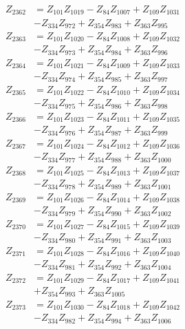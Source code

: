 \begin{multicols}{2}
\begin{align}
Z_{2362} &= Z_{101}Z_{1019} - Z_{84}Z_{1007} + Z_{109}Z_{1031}  \nonumber \\
&- Z_{334}Z_{972} + Z_{354}Z_{983} + Z_{363}Z_{995} \nonumber \\
Z_{2363} &= Z_{101}Z_{1020} - Z_{84}Z_{1008} + Z_{109}Z_{1032}  \nonumber \\
&- Z_{334}Z_{973} + Z_{354}Z_{984} + Z_{363}Z_{996} \nonumber \\
Z_{2364} &= Z_{101}Z_{1021} - Z_{84}Z_{1009} + Z_{109}Z_{1033}  \nonumber \\
&- Z_{334}Z_{974} + Z_{354}Z_{985} + Z_{363}Z_{997} \nonumber \\
Z_{2365} &= Z_{101}Z_{1022} - Z_{84}Z_{1010} + Z_{109}Z_{1034}  \nonumber \\
&- Z_{334}Z_{975} + Z_{354}Z_{986} + Z_{363}Z_{998} \nonumber \\
Z_{2366} &= Z_{101}Z_{1023} - Z_{84}Z_{1011} + Z_{109}Z_{1035}  \nonumber \\
&- Z_{334}Z_{976} + Z_{354}Z_{987} + Z_{363}Z_{999} \nonumber \\
Z_{2367} &= Z_{101}Z_{1024} - Z_{84}Z_{1012} + Z_{109}Z_{1036}  \nonumber \\
&- Z_{334}Z_{977} + Z_{354}Z_{988} + Z_{363}Z_{1000} \nonumber \\
Z_{2368} &= Z_{101}Z_{1025} - Z_{84}Z_{1013} + Z_{109}Z_{1037}  \nonumber \\
&- Z_{334}Z_{978} + Z_{354}Z_{989} + Z_{363}Z_{1001} \nonumber \\
Z_{2369} &= Z_{101}Z_{1026} - Z_{84}Z_{1014} + Z_{109}Z_{1038}  \nonumber \\
&- Z_{334}Z_{979} + Z_{354}Z_{990} + Z_{363}Z_{1002} \nonumber \\
Z_{2370} &= Z_{101}Z_{1027} - Z_{84}Z_{1015} + Z_{109}Z_{1039}  \nonumber \\
&- Z_{334}Z_{980} + Z_{354}Z_{991} + Z_{363}Z_{1003} \nonumber \\
Z_{2371} &= Z_{101}Z_{1028} - Z_{84}Z_{1016} + Z_{109}Z_{1040}  \nonumber \\
&- Z_{334}Z_{981} + Z_{354}Z_{992} + Z_{363}Z_{1004} \nonumber \\
Z_{2372} &= Z_{101}Z_{1029} - Z_{84}Z_{1017} + Z_{109}Z_{1041}  \nonumber \\
&+ Z_{354}Z_{993} + Z_{363}Z_{1005} \nonumber \\
Z_{2373} &= Z_{101}Z_{1030} - Z_{84}Z_{1018} + Z_{109}Z_{1042}  \nonumber \\
&- Z_{334}Z_{982} + Z_{354}Z_{994} + Z_{363}Z_{1006} \nonumber \\

\end{align}
\end{multicols}
